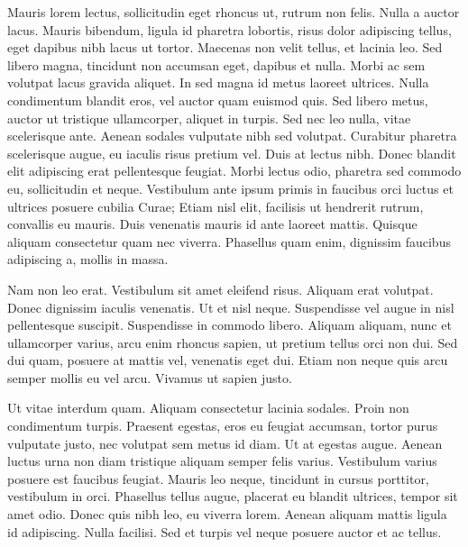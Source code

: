 \begin{acknowledgments}
Mauris lorem lectus, sollicitudin eget rhoncus ut, rutrum non felis.
Nulla a auctor lacus.
Mauris bibendum, ligula id pharetra lobortis, risus dolor adipiscing tellus, eget dapibus nibh lacus ut tortor.
Maecenas non velit tellus, et lacinia leo.
Sed libero magna, tincidunt non accumsan eget, dapibus et nulla.
Morbi ac sem volutpat lacus gravida aliquet.
In sed magna id metus laoreet ultrices.
Nulla condimentum blandit eros, vel auctor quam euismod quis.
Sed libero metus, auctor ut tristique ullamcorper, aliquet in turpis.
Sed nec leo nulla, vitae scelerisque ante.
Aenean sodales vulputate nibh sed volutpat.
Curabitur pharetra scelerisque augue, eu iaculis risus pretium vel.
Duis at lectus nibh.
Donec blandit elit adipiscing erat pellentesque feugiat.
Morbi lectus odio, pharetra sed commodo eu, sollicitudin et neque.
Vestibulum ante ipsum primis in faucibus orci luctus et ultrices posuere cubilia Curae; Etiam nisl elit, facilisis ut hendrerit rutrum, convallis eu mauris.
Duis venenatis mauris id ante laoreet mattis.
Quisque aliquam consectetur quam nec viverra.
Phasellus quam enim, dignissim faucibus adipiscing a, mollis in massa.

Nam non leo erat.
Vestibulum sit amet eleifend risus.
Aliquam erat volutpat.
Donec dignissim iaculis venenatis.
Ut et nisl neque.
Suspendisse vel augue in nisl pellentesque suscipit.
Suspendisse in commodo libero.
Aliquam aliquam, nunc et ullamcorper varius, arcu enim rhoncus sapien, ut pretium tellus orci non dui.
Sed dui quam, posuere at mattis vel, venenatis eget dui.
Etiam non neque quis arcu semper mollis eu vel arcu.
Vivamus ut sapien justo.

Ut vitae interdum quam.
Aliquam consectetur lacinia sodales.
Proin non condimentum turpis.
Praesent egestas, eros eu feugiat accumsan, tortor purus vulputate justo, nec volutpat sem metus id diam.
Ut at egestas augue.
Aenean luctus urna non diam tristique aliquam semper felis varius.
Vestibulum varius posuere est faucibus feugiat.
Mauris leo neque, tincidunt in cursus porttitor, vestibulum in orci.
Phasellus tellus augue, placerat eu blandit ultrices, tempor sit amet odio.
Donec quis nibh leo, eu viverra lorem.
Aenean aliquam mattis ligula id adipiscing.
Nulla facilisi.
Sed et turpis vel neque posuere auctor et ac tellus.
\end{acknowledgments}
